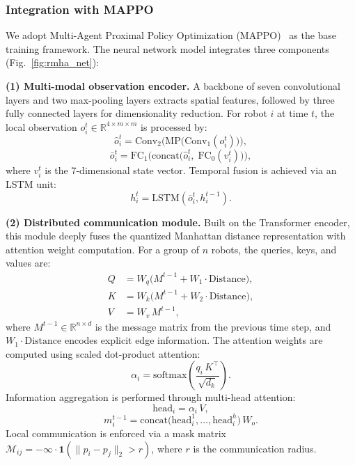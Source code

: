 \documentclass[conference]{IEEEtran}
\begin{document}
\subsubsection{Integration with MAPPO}

We adopt Multi-Agent Proximal Policy Optimization
(MAPPO)~\cite{zhou2025mappo,zhang2025mappo,ding2025mappo}
as the base training framework.
The neural network model integrates three components
(Fig.~\ref{fig:rmha_net}):

\textbf{(1) Multi-modal observation encoder.}
A backbone of seven convolutional layers and two max-pooling
layers extracts spatial features, followed by three fully
connected layers for dimensionality reduction.
For robot $i$ at time $t$, the local observation
$o_i^t \in \mathbb{R}^{4\times m\times m}$ is processed by:
\begin{equation}\label{eq:conv}
  \hat{o}_i^t = \mathrm{Conv}_2\!\bigl(\mathrm{MP}\bigl(
    \mathrm{Conv}_1(o_i^t)\bigr)\bigr),
\end{equation}
\begin{equation}\label{eq:fc_concat}
  \bar{o}_i^t = \mathrm{FC}_1\!\bigl(\mathrm{concat}\bigl(
    \hat{o}_i^t,\; \mathrm{FC}_0(v_i^t)\bigr)\bigr),
\end{equation}
where $v_i^t$ is the 7-dimensional state vector.
Temporal fusion is achieved via an LSTM unit:
\begin{equation}\label{eq:lstm}
  h_i^t = \mathrm{LSTM}(\bar{o}_i^t, h_i^{t-1}).
\end{equation}

\textbf{(2) Distributed communication module.}
Built on the Transformer encoder, this module deeply fuses the
quantized Manhattan distance representation with attention weight
computation.
For a group of $n$ robots, the queries, keys, and values are:
\begin{align}
  Q &= W_q\bigl(M^{t-1} + W_1 \cdot \mathrm{Distance}\bigr),
      \label{eq:Q} \\
  K &= W_k\bigl(M^{t-1} + W_2 \cdot \mathrm{Distance}\bigr),
      \label{eq:K} \\
  V &= W_v\, M^{t-1}, \label{eq:V}
\end{align}
where $M^{t-1}\in\mathbb{R}^{n\times d}$ is the message matrix
from the previous time step, and
$W_1\cdot\mathrm{Distance}$ encodes explicit edge information.
The attention weights are computed using scaled dot-product
attention:
\begin{equation}\label{eq:attn_weight}
  \alpha_i = \mathrm{softmax}\!\left(
    \frac{q_i\, K^\top}{\sqrt{d_k}}\right).
\end{equation}
Information aggregation is performed through multi-head attention:
\begin{equation}\label{eq:head}
  \mathrm{head}_i = \alpha_i\, V,
\end{equation}
\begin{equation}\label{eq:msg}
  m_i^{t-1} = \mathrm{concat}\!\bigl(
    \mathrm{head}_i^1, \ldots, \mathrm{head}_i^h\bigr)\, W_o.
\end{equation}
Local communication is enforced via a mask matrix
$\mathcal{M}_{ij}=-\infty \cdot \mathbf{1}(\|p_i-p_j\|_2 > r)$,
where $r$ is the communication radius.
\end{document}
